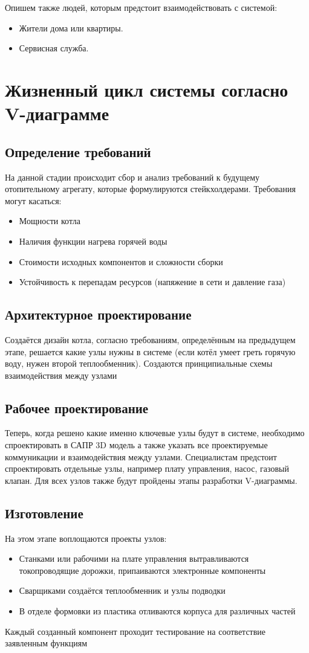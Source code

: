 \documentclass[bibliography=totocnumbered]{scrartcl}
\begin{document}
Опишем также людей, которым предстоит взаимодействовать с системой:
\begin{itemize}
  \item Жители дома или квартиры.
  \item Сервисная служба.
\end{itemize}

\section{Жизненный цикл системы согласно V-диаграмме}

\subsection{Определение требований}
На данной стадии происходит сбор и анализ требований к будущему отопительному агрегату, которые формулируются стейкхолдерами. Требования могут касаться:
\begin{itemize}
  \item Мощности котла
  \item Наличия функции нагрева горячей воды
  \item Стоимости исходных компонентов и сложности сборки
  \item Устойчивость к перепадам ресурсов (напяжение в сети и давление газа)
\end{itemize}

\subsection{Архитектурное проектирование}
Создаётся дизайн котла, согласно требованиям, определённым на предыдущем этапе, решается какие узлы нужны в системе (если котёл умеет греть горячую воду, нужен второй теплообменник). Создаются принципиальные схемы взаимодействия между узлами

\subsection{Рабочее проектирование}
Теперь, когда решено какие именно ключевые узлы будут в системе, необходимо спроектировать в САПР 3D модель а также указать все проектируемые коммуникации и взаимодействия между узлами. Специалистам предстоит спроектировать отдельные узлы, например плату управления, насос, газовый клапан. Для всех узлов также будут пройдены этапы разработки V-диаграммы.

\subsection{Изготовление}
На этом этапе воплощаются проекты узлов:
\begin{itemize}
  \item Станками или рабочими на плате управления вытравливаются токопроводящие дорожки, припаиваются электронные компоненты
  \item Сварщиками создаётся теплообменник и узлы подводки
  \item В отделе формовки из пластика отливаются корпуса для различных частей
\end{itemize}
Каждый созданный компонент проходит тестирование на соответствие заявленным функциям
\end{document}
